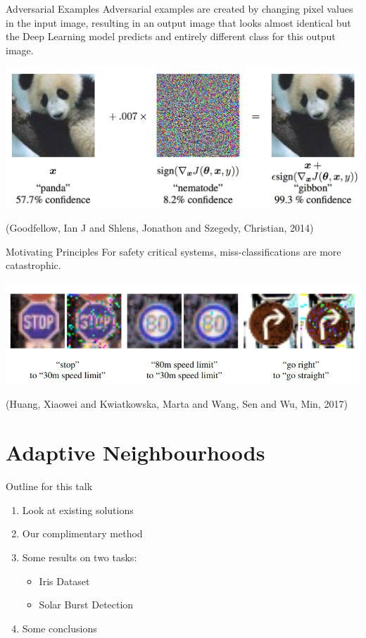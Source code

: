 \documentclass[smaller]{beamer}
\begin{document}
\begin{frame}[label={sec:org3b504d9}]{Adversarial Examples}
Adversarial examples are created by changing pixel values in the input image,
resulting in an output image that looks almost identical but the Deep Learning model
predicts and entirely different class for this output image.

\begin{center}
\includegraphics[width=.9\linewidth]{images/fgsm_panda_image.png}
\end{center}
(Goodfellow, Ian J and Shlens, Jonathon and Szegedy, Christian, 2014)
\end{frame}

\begin{frame}[label={sec:org4fda18b}]{Motivating Principles}
For safety critical systems, miss-classifications are more catastrophic.

\begin{center}
\includegraphics[width=.9\linewidth]{images/signs.png}
\end{center}
(Huang, Xiaowei and Kwiatkowska, Marta and Wang, Sen and Wu, Min, 2017)
\end{frame}

\section{Adaptive Neighbourhoods}
\label{sec:orge927552}

\begin{frame}[label={sec:orga966cae}]{Outline for this talk}
\begin{enumerate}
\item Look at existing solutions
\item Our complimentary method
\item Some results on two tasks:
\begin{itemize}
\item Iris Dataset
\item Solar Burst Detection
\end{itemize}
\item Some conclusions
\end{enumerate}
\end{frame}
\end{document}
